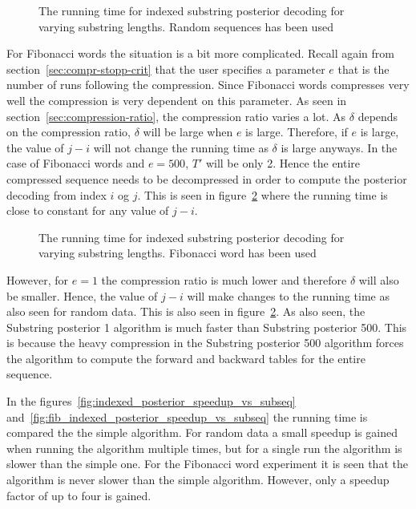\begin{figure}
  \centering
  
  \caption{The running time for indexed substring posterior decoding for
    varying substring lengths. Random sequences has been used}
  \label{fig:assymptotic_indexed_posterior_subseq_length.tex}
\end{figure}

For Fibonacci words the situation is a bit more complicated. Recall again from
section~\ref{sec:compr-stopp-crit} that the user specifies a parameter $e$ that
is the number of runs following the compression. Since Fibonacci words
compresses very well the compression is very dependent on this parameter. As
seen in section~\ref{sec:compression-ratio}, the compression ratio varies a
lot.  As $\delta$ depends on the compression ratio,
$\delta$ will be large when $e$ is large. Therefore, if $e$ is large, the value
of $j - i$ will not change the running time as $\delta$ is large anyways. In
the case of Fibonacci words and $e = 500$, $T'$ will be only 2. Hence the
entire compressed sequence needs to be decompressed in order to compute the
posterior decoding from index $i$ og $j$. This is seen in
figure~\ref{fig:assymptotic_indexed_posterior_fib_subseq_length.tex} where the
running time is close to constant for any value of $j - i$.

\begin{figure}
  \centering
  
  \caption{The running time for indexed substring posterior decoding for
    varying substring lengths. Fibonacci word has been used}
  \label{fig:assymptotic_indexed_posterior_fib_subseq_length.tex}
\end{figure}

However, for $e = 1$ the compression ratio is much lower and therefore $\delta$
will also be smaller. Hence, the value of $j - i$ will make changes to the
running time as also seen for random data. This is also seen in
figure~\ref{fig:assymptotic_indexed_posterior_fib_subseq_length.tex}. As also
seen, the Substring posterior 1 algorithm is much faster than Substring
posterior 500. This is because the heavy compression in the Substring posterior
500 algorithm forces the algorithm to compute the forward and backward tables
for the entire sequence.

In the figures~\ref{fig:indexed_posterior_speedup_vs_subseq}
and~\ref{fig:fib_indexed_posterior_speedup_vs_subseq} the running time is
compared the the simple algorithm. For random data a small speedup is gained
when running the algorithm multiple times, but for a single run the algorithm
is slower than the simple one. For the Fibonacci word experiment it is seen
that the algorithm is never slower than the simple algorithm. However, only a
speedup factor of up to four is gained.

